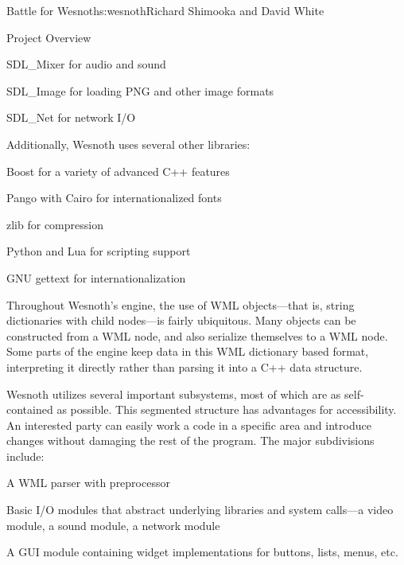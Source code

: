 \begin{aosachapter}{Battle for Wesnoth}{s:wesnoth}{Richard Shimooka and David White}
\begin{aosasect1}{Project Overview}
\begin{aosaitemize}
  \item SDL\_Mixer for audio and sound

  \item SDL\_Image for loading PNG and other image formats

  \item SDL\_Net for network I/O

\end{aosaitemize}

Additionally, Wesnoth uses several other libraries:

\begin{aosaitemize}

  \item Boost for a variety of advanced C++ features

  \item Pango with Cairo for internationalized fonts

  \item zlib for compression

  \item Python and Lua for scripting support

  \item GNU gettext for internationalization

\end{aosaitemize}

Throughout Wesnoth's engine, the use of WML objects---that is, string
dictionaries with child nodes---is fairly ubiquitous.  Many objects
can be constructed from a WML node, and also serialize themselves to a
WML node. Some parts of the engine keep data in this WML dictionary
based format, interpreting it directly rather than parsing it into a
C++ data structure.

Wesnoth utilizes several important subsystems, most of which are as
self-contained as possible. This segmented structure has advantages
for accessibility. An interested party can easily work a code in a
specific area and introduce changes without damaging the rest of the
program. The major subdivisions include:

\begin{aosaitemize}

  \item A WML parser with preprocessor

  \item Basic I/O modules that abstract underlying libraries and
  system calls---a video module, a sound module, a network module

  \item A GUI module containing widget implementations for buttons,
  lists, menus, etc.


\end{aosaitemize}
\end{aosasect1}
\end{aosachapter}
